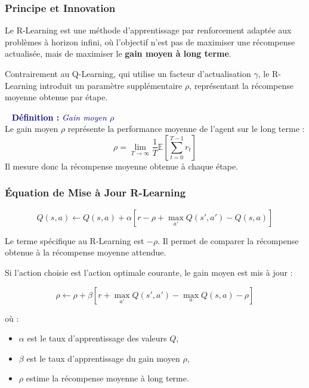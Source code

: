 \documentclass[11pt,a4paper]{article}
\newenvironment{defbox}[1]{%
  \vspace{3pt}\begin{framed}
  \noindent{\color{NavyBlue}\rule{0.3cm}{3pt}}~%
  \textcolor{DarkBlue}{\textbf{Définition :} \textit{#1}}\\[3pt]}
  {\end{framed}\vspace{3pt}}
\newcommand{\E}{\mathbb{E}}
\begin{document}
\subsubsection{Principe et Innovation}

Le R-Learning est une méthode d'apprentissage par renforcement adaptée aux problèmes
à horizon infini, où l'objectif n'est pas de maximiser une récompense actualisée,
mais de maximiser le \textbf{gain moyen à long terme}.

Contrairement au Q-Learning, qui utilise un facteur d'actualisation $\gamma$,
le R-Learning introduit un paramètre supplémentaire $\rho$, représentant
la récompense moyenne obtenue par étape.

\begin{defbox}{Gain moyen $\rho$}
Le gain moyen $\rho$ représente la performance moyenne de l'agent sur le long terme :
\[
\rho =
\lim_{T \to \infty}
\frac{1}{T}
\E\left[
\sum_{t=0}^{T-1} r_t
\right]
\]
Il mesure donc la récompense moyenne obtenue à chaque étape.
\end{defbox}

\subsubsection{Équation de Mise à Jour R-Learning}

\begin{tcolorbox}[colback=LightOrange,colframe=DarkOrange,arc=4pt]
\begin{equation}
\boxed{
Q(s,a) \leftarrow Q(s,a)
+
\alpha
\left[
r - \rho + \max_{a'} Q(s',a') - Q(s,a)
\right]
}
\end{equation}
\end{tcolorbox}

Le terme spécifique au R-Learning est $-\rho$.
Il permet de comparer la récompense obtenue à la récompense moyenne attendue.

Si l'action choisie est l'action optimale courante, le gain moyen est mis à jour :

\begin{tcolorbox}[colback=LightBlue,colframe=NavyBlue,arc=4pt]
\begin{equation}
\boxed{
\rho \leftarrow \rho
+
\beta
\left[
r + \max_{a'}Q(s',a') - \max_a Q(s,a) - \rho
\right]
}
\end{equation}
\end{tcolorbox}

où :
\begin{itemize}
  \item $\alpha$ est le taux d'apprentissage des valeurs $Q$,
  \item $\beta$ est le taux d'apprentissage du gain moyen $\rho$,
  \item $\rho$ estime la récompense moyenne à long terme.
\end{itemize}
\end{document}
